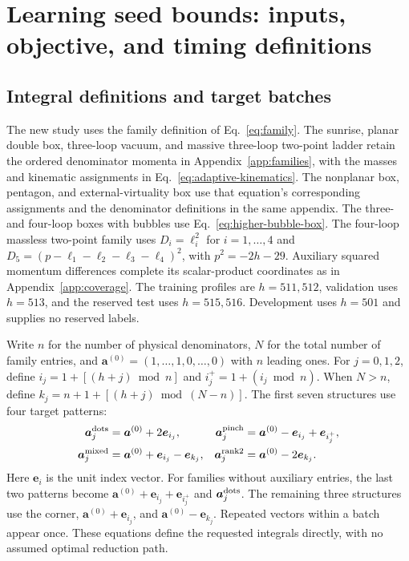 \section{Learning seed bounds: inputs, objective, and timing definitions}
\label{app:learned-bounds}
\subsection{Integral definitions and target batches}
The new study uses the family definition of Eq.~\eqref{eq:family}. The sunrise, planar double box, three-loop vacuum, and massive three-loop two-point ladder retain the ordered denominator momenta in Appendix~\ref{app:families}, with the masses and kinematic assignments in Eq.~\eqref{eq:adaptive-kinematics}. The nonplanar box, pentagon, and external-virtuality box use that equation's corresponding assignments and the denominator definitions in the same appendix. The three- and four-loop boxes with bubbles use Eq.~\eqref{eq:higher-bubble-box}. The four-loop massless two-point family uses $D_i=\ell_i^2$ for $i=1,\ldots,4$ and $D_5=(p-\ell_1-\ell_2-\ell_3-\ell_4)^2$, with $p^2=-2h-29$. Auxiliary squared momentum differences complete its scalar-product coordinates as in Appendix~\ref{app:coverage}. The training profiles are $h=511,512$, validation uses $h=513$, and the reserved test uses $h=515,516$. Development uses $h=501$ and supplies no reserved labels.

Write $n$ for the number of physical denominators, $N$ for the total number of family entries, and $\boldsymbol a^{(0)}=(1,\ldots,1,0,\ldots,0)$ with $n$ leading ones. For $j=0,1,2$, define $i_j=1+[(h+j)\bmod n]$ and $i_j^+=1+(i_j\bmod n)$. When $N>n$, define $k_j=n+1+[(h+j)\bmod(N-n)]$. The first seven structures use four target patterns:
\begin{align}
\boldsymbol a^{\rm dots}_j&=\boldsymbol a^{(0)}+2\boldsymbol e_{i_j},&
\boldsymbol a^{\rm pinch}_j&=\boldsymbol a^{(0)}-\boldsymbol e_{i_j}+\boldsymbol e_{i_j^+},\nonumber\\
\boldsymbol a^{\rm mixed}_j&=\boldsymbol a^{(0)}+\boldsymbol e_{i_j}-\boldsymbol e_{k_j},&
\boldsymbol a^{\rm rank2}_j&=\boldsymbol a^{(0)}-2\boldsymbol e_{k_j}.
\label{eq:bounds-targets}
\end{align}
Here $\boldsymbol e_i$ is the unit index vector. For families without auxiliary entries, the last two patterns become $\boldsymbol a^{(0)}+\boldsymbol e_{i_j}+\boldsymbol e_{i_j^+}$ and $\boldsymbol a^{\rm dots}_j$. The remaining three structures use the corner, $\boldsymbol a^{(0)}+\boldsymbol e_{i_j}$, and $\boldsymbol a^{(0)}-\boldsymbol e_{k_j}$. Repeated vectors within a batch appear once. These equations define the requested integrals directly, with no assumed optimal reduction path.


